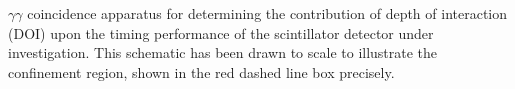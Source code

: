 \label{fig:doi-ctr} $\gamma\gamma$ coincidence apparatus for determining the contribution of depth of interaction (DOI) upon the timing performance of the scintillator detector under investigation. This schematic has been drawn to scale to illustrate the confinement region, shown in the red dashed line box precisely.
